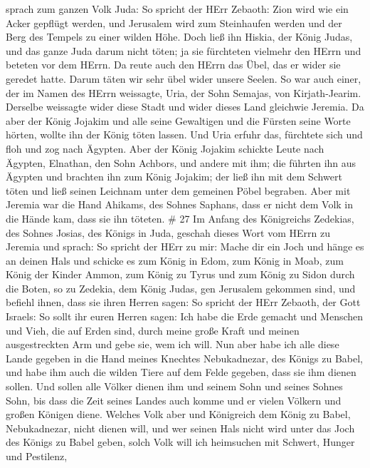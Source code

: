 sprach zum ganzen Volk Juda: So spricht der HErr Zebaoth: Zion wird wie
ein Acker gepflügt werden, und Jerusalem wird zum Steinhaufen werden und
der Berg des Tempels zu einer wilden Höhe.  Doch ließ ihn
Hiskia, der König Judas, und das ganze Juda darum nicht töten; ja sie
fürchteten vielmehr den HErrn und beteten vor dem HErrn. Da reute auch
den HErrn das Übel, das er wider sie geredet hatte. Darum täten wir sehr
übel wider unsere Seelen.  So war auch einer, der im Namen
des HErrn weissagte, Uria, der Sohn Semajas, von Kirjath-Jearim.
Derselbe weissagte wider diese Stadt und wider dieses Land gleichwie
Jeremia.  Da aber der König Jojakim und alle seine
Gewaltigen und die Fürsten seine Worte hörten, wollte ihn der König
töten lassen. Und Uria erfuhr das, fürchtete sich und floh und zog nach
Ägypten.  Aber der König Jojakim schickte Leute nach
Ägypten, Elnathan, den Sohn Achbors, und andere mit ihm; 
die führten ihn aus Ägypten und brachten ihn zum König Jojakim; der ließ
ihn mit dem Schwert töten und ließ seinen Leichnam unter dem gemeinen
Pöbel begraben.  Aber mit Jeremia war die Hand Ahikams, des
Sohnes Saphans, dass er nicht dem Volk in die Hände kam, dass sie ihn
töteten. \# 27  Im Anfang des Königreichs Zedekias, des
Sohnes Josias, des Königs in Juda, geschah dieses Wort vom HErrn zu
Jeremia und sprach:  So spricht der HErr zu mir: Mache dir
ein Joch und hänge es an deinen Hals  und schicke es zum
König in Edom, zum König in Moab, zum König der Kinder Ammon, zum König
zu Tyrus und zum König zu Sidon durch die Boten, so zu Zedekia, dem
König Judas, gen Jerusalem gekommen sind,  und befiehl
ihnen, dass sie ihren Herren sagen: So spricht der HErr Zebaoth, der
Gott Israels: So sollt ihr euren Herren sagen:  Ich habe die
Erde gemacht und Menschen und Vieh, die auf Erden sind, durch meine
große Kraft und meinen ausgestreckten Arm und gebe sie, wem ich will.
 Nun aber habe ich alle diese Lande gegeben in die Hand
meines Knechtes Nebukadnezar, des Königs zu Babel, und habe ihm auch die
wilden Tiere auf dem Felde gegeben, dass sie ihm dienen sollen.
 Und sollen alle Völker dienen ihm und seinem Sohn und
seines Sohnes Sohn, bis dass die Zeit seines Landes auch komme und er
vielen Völkern und großen Königen diene.  Welches Volk aber
und Königreich dem König zu Babel, Nebukadnezar, nicht dienen will, und
wer seinen Hals nicht wird unter das Joch des Königs zu Babel geben,
solch Volk will ich heimsuchen mit Schwert, Hunger und Pestilenz,
